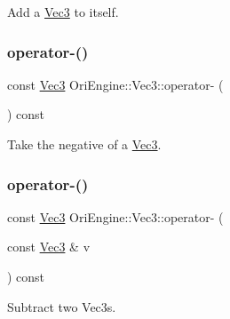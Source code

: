 Add a \hyperlink{struct_ori_engine_1_1_vec3}{Vec3} to itself. 

\hypertarget{struct_ori_engine_1_1_vec3_a15bce489607090ec4bda56a1d5b0c0f1}{}\label{struct_ori_engine_1_1_vec3_a15bce489607090ec4bda56a1d5b0c0f1} 
\subsubsection{\texorpdfstring{operator-\/()}{operator-()}\hspace{0.1cm}{\footnotesize\ttfamily [1/2]}}
{\footnotesize\ttfamily const \hyperlink{struct_ori_engine_1_1_vec3}{Vec3} Ori\+Engine\+::\+Vec3\+::operator-\/ (\begin{DoxyParamCaption}{ }\end{DoxyParamCaption}) const\hspace{0.3cm}{\ttfamily [inline]}}



Take the negative of a \hyperlink{struct_ori_engine_1_1_vec3}{Vec3}. 

\hypertarget{struct_ori_engine_1_1_vec3_a18dacfa9dfb456dd11e58a7be4f01e8d}{}\label{struct_ori_engine_1_1_vec3_a18dacfa9dfb456dd11e58a7be4f01e8d} 
\subsubsection{\texorpdfstring{operator-\/()}{operator-()}\hspace{0.1cm}{\footnotesize\ttfamily [2/2]}}
{\footnotesize\ttfamily const \hyperlink{struct_ori_engine_1_1_vec3}{Vec3} Ori\+Engine\+::\+Vec3\+::operator-\/ (\begin{DoxyParamCaption}\item[{const \hyperlink{struct_ori_engine_1_1_vec3}{Vec3} \&}]{v }\end{DoxyParamCaption}) const\hspace{0.3cm}{\ttfamily [inline]}}



Subtract two Vec3s. 

\hypertarget{struct_ori_engine_1_1_vec3_a5ced07421d0576122c0179517947039b}{}\label{struct_ori_engine_1_1_vec3_a5ced07421d0576122c0179517947039b} 
